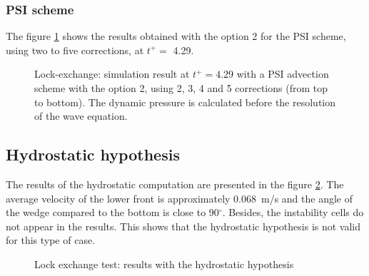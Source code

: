 \subsubsection{PSI scheme}
The figure \ref{fig:lock-exchange_dp_yes_PSI2} shows the results
obtained with the option 2 for the PSI scheme, using two to five corrections, at $t^+=$ 4.29.
\begin{figure}[ht]
  \begin{center}
    \caption{Lock-exchange: simulation result at $t^+=4.29$ with a PSI advection scheme with the
      option 2, using 2, 3, 4 and 5 corrections (from top to bottom).
      The dynamic pressure is calculated before the resolution of the wave equation.}
    \label{fig:lock-exchange_dp_yes_PSI2}
  \end{center}
\end{figure}

\clearpage

\subsection{Hydrostatic hypothesis}

The results of the hydrostatic computation are presented in the figure
\ref{t3d:lock-exchange:hydro_res}.
The average velocity of the lower front is approximately 0.068~m/s and
the angle of the wedge compared to the bottom is close to 90$^\circ$.
Besides, the instability cells do not appear in the results.
This shows that the hydrostatic hypothesis is not valid for this type of
case.
\begin{figure}[h]
  \centering
  \caption{Lock exchange test: results with the hydrostatic hypothesis}
  \label{t3d:lock-exchange:hydro_res}
\end{figure}
%
